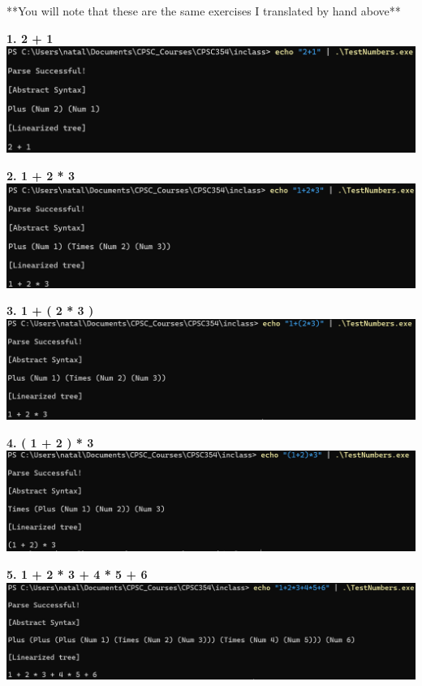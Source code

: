 \documentclass{article}
\theoremstyle{theorem}
\theoremstyle{definition}
\theoremstyle{remark}
\begin{document}
**You will note that these are the same exercises I translated by hand above**\\
\begin{center}
  \textbf{1. 2 + 1} \\
  \includegraphics[width=15cm]{bnfc_exercise1a.png}

  \textbf{2. 1 + 2 * 3}\\
  \includegraphics[width=15cm]{bnfc_exercise1b.png}

  \textbf{3. 1 + ( 2 * 3 )}\\
  \includegraphics[width=15cm]{bnfc_exercise1c.png}

  \textbf{4. ( 1 + 2 ) * 3}\\
  \includegraphics[width=15cm]{bnfc_exercise1d.png}

  \textbf{5. 1 + 2 * 3 + 4 * 5 + 6}\\
  \includegraphics[width=15cm]{bnfc_exercise1e.png}
\end{center}
\end{document}
